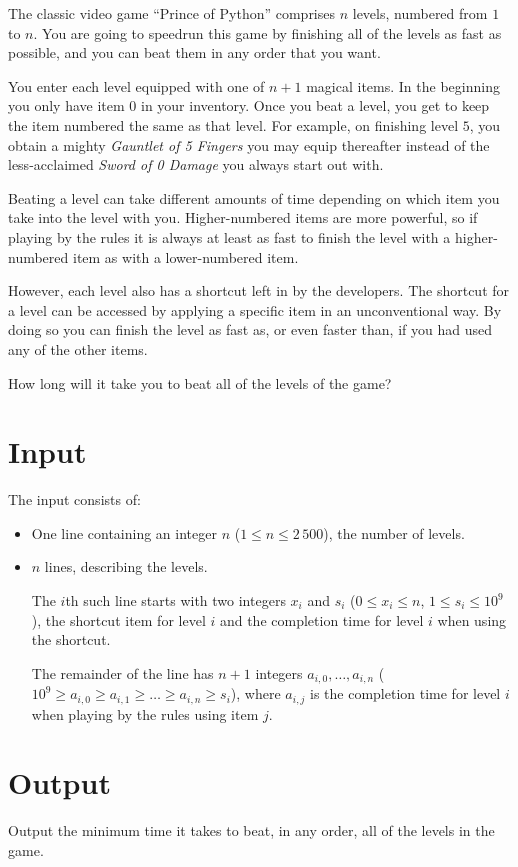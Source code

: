 
The classic video game ``Prince of Python'' comprises $n$ levels, numbered from
$1$ to $n$. You are going to speedrun this game by finishing all of the levels
as fast as possible, and you can beat them in any order that you want.

You enter each level equipped with one of $n+1$ magical items. In the
beginning you only have item $0$ in your inventory. Once you beat a level, you
get to keep the item numbered the same as that level.  For example, on
finishing level $5$, you obtain a mighty \emph{Gauntlet of 5 Fingers} you may
equip thereafter instead of the less-acclaimed \emph{Sword of 0 Damage} you
always start out with.

Beating a level can take different amounts of time depending on which item you
take into the level with you. Higher-numbered items are more powerful, so if
playing by the rules it is always at least as fast to finish the level with a
higher-numbered item as with a lower-numbered item.

However, each level also has a shortcut left in by the developers.  The
shortcut for a level can be accessed by applying a specific item in an
unconventional way. By doing so you can finish the level as fast as, or even
faster than, if you had used any of the other items.

How long will it take you to beat all of the levels of the game?

\vspace{-2.5mm}

\section*{Input}

The input consists of:
\begin{itemize}
  \item One line containing an integer $n$ ($1 \le n \le 2\,500$), the number of levels.
  \item $n$ lines, describing the levels.

        The $i$th such line starts with two integers $x_i$ and $s_i$ ($0 \le x_i \le n$, $1 \le s_i \le 10^9$), the shortcut item for level $i$ and the completion time for level $i$ when using the shortcut.

        The remainder of the line has $n+1$ integers $a_{i,0}, \ldots, a_{i,n}$ ($10^9 \ge a_{i,0} \ge a_{i,1} \ge \ldots \ge a_{i,n} \ge s_i$), where $a_{i,j}$ is the completion time for level $i$ when playing by the rules using item $j$.
\end{itemize}

\vspace{-2.5mm}

\section*{Output}
Output the minimum time it takes to beat, in any order, all of the levels in the game.
